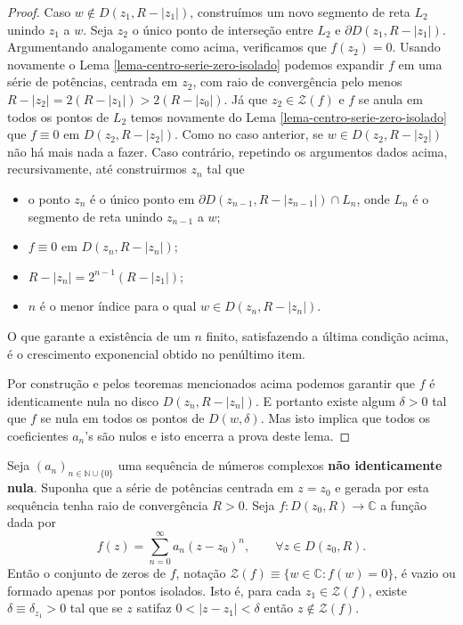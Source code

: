 \begin{proof}
Caso $w\notin D(z_1,R-|z_1|)$, construímos um novo segmento de reta $L_2$
unindo $z_1$ a $w$. Seja $z_2$ o único ponto de interseção entre $L_2$
e $\partial D(z_1,R-|z_1|)$. Argumentando analogamente como acima, verificamos
que $f(z_2)=0$. Usando novamente o Lema \ref{lema-centro-serie-zero-isolado} 
podemos expandir $f$ em uma série de potências, centrada em $z_2$, 
com raio de convergência pelo menos $R-|z_2| = 2(R-|z_1|)>2(R-|z_0|)$.
Já que $z_2\in\mathcal{Z}(f)$ e $f$ se anula em todos os pontos de $L_2$
temos novamente do Lema \ref{lema-centro-serie-zero-isolado} que 
$f\equiv 0$ em $D(z_2,R-|z_2|)$. Como no caso anterior,
se $w\in D(z_2,R-|z_2|)$ não há mais nada a fazer. Caso contrário, 
repetindo os argumentos dados acima, recursivamente, 
até construirmos $z_n$ tal que 
\begin{itemize}
\item
o ponto $z_n$ é o único ponto em $\partial D(z_{n-1},R-|z_{n-1}|)\cap L_n$,
onde $L_n$ é o segmento de reta unindo $z_{n-1}$ a $w$;

\item $f\equiv 0$ em  $D(z_{n},R-|z_{n}|)$;

\item $R-|z_n|= 2^{n-1}(R-|z_1|)$;

\item  $n$ é o menor índice para o qual $w\in D(z_{n},R-|z_{n}|)$.
\end{itemize} 

O que garante a existência de um $n$ finito, satisfazendo a última condição
acima, é o crescimento exponencial obtido no penúltimo item. 

Por construção e pelos teoremas mencionados acima podemos garantir que 
$f$ é identicamente nula no disco $D(z_{n},R-|z_{n}|)$. E portanto
existe algum $\delta>0$ tal que $f$ se nula em todos
os pontos de $D(w,\delta)$. Mas isto implica que todos 
os coeficientes $a_n$'s são nulos e isto encerra a prova deste lema.
\end{proof}



\begin{teorema}
\label{teo-zeros-series-isolados}
Seja $(a_n)_{n\in\mathbb{N}\cup\{0\}}$ uma sequência de números complexos
\textbf{não identicamente nula}. Suponha que a série de potências 
centrada em $z=z_0$ e gerada por esta sequência tenha raio de convergência $R>0$. 
Seja $f:D(z_0,R)\to\mathbb{C}$ a função dada por
\[
f(z) = \sum_{n=0}^{\infty}a_n(z-z_0)^n, \qquad \forall z\in D(z_0,R).
\]
Então o conjunto de zeros de $f$, notação 
$\mathcal{Z}(f)\equiv \{w\in\mathbb{C}: f(w)=0\}$,
é vazio ou formado apenas por pontos isolados. Isto é, 
para cada $z_1\in \mathcal{Z}(f)$, existe $\delta\equiv\delta_{z_1}>0$ tal que 
se $z$ satifaz $0<|z-z_1|<\delta$ então $z\notin \mathcal{Z}(f)$.
\end{teorema}



